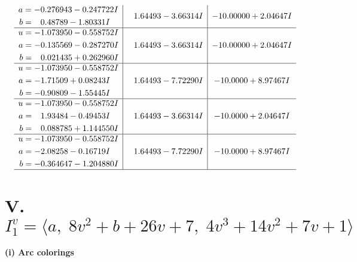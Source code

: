 \documentclass[1p]{elsarticle_modified}
\theoremstyle{definition}
\begin{document}
$$\begin{array}{c|c|c}
\begin{aligned}
a &= -0.276943 - 0.247722 I \\
b &= \phantom{-}0.48789 - 1.80331 I\end{aligned}
 & \phantom{-}1.64493 - 3.66314 I & -10.00000 + 2.04647 I \\ \hline\begin{aligned}
u &= -1.073950 - 0.558752 I \\
a &= -0.135569 - 0.287270 I \\
b &= \phantom{-}0.021435 + 0.262960 I\end{aligned}
 & \phantom{-}1.64493 - 3.66314 I & -10.00000 + 2.04647 I \\ \hline\begin{aligned}
u &= -1.073950 - 0.558752 I \\
a &= -1.71509 + 0.08243 I \\
b &= -0.90809 - 1.55445 I\end{aligned}
 & \phantom{-}1.64493 - 7.72290 I & -10.0000 + 8.97467 I \\ \hline\begin{aligned}
u &= -1.073950 - 0.558752 I \\
a &= \phantom{-}1.93484 - 0.49453 I \\
b &= \phantom{-}0.088785 + 1.144550 I\end{aligned}
 & \phantom{-}1.64493 - 3.66314 I & -10.0000 + 2.04647 I \\ \hline\begin{aligned}
u &= -1.073950 - 0.558752 I \\
a &= -2.08258 - 0.16719 I \\
b &= -0.364647 - 1.204880 I\end{aligned}
 & \phantom{-}1.64493 - 7.72290 I & -10.0000 + 8.97467 I\\
 \hline 
 \end{array}$$\newpage\newpage\renewcommand{\arraystretch}{1}
\centering \section*{V. $I^v_{1}= \langle a,\;8 v^2+b+26 v+7,\;4 v^3+14 v^2+7 v+1 \rangle$}
\flushleft \textbf{(i) Arc colorings}\\
\end{document}
